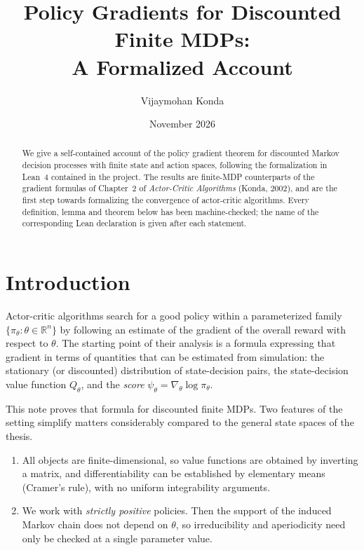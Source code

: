 \documentclass[11pt]{article}
\title{Policy Gradients for Discounted Finite MDPs:\\ A Formalized Account}
\author{Vijaymohan Konda}
\date{November 2026}
\theoremstyle{definition}
\theoremstyle{remark}
\newcommand{\lean}[1]{\texttt{\detokenize{#1}}}
\newcommand{\R}{\mathbb{R}}
\begin{document}
\maketitle

\begin{abstract}
We give a self-contained account of the policy gradient theorem for discounted
Markov decision processes with finite state and action spaces, following the
formalization in Lean~4 contained in the \lean{rl-theory-in-lean} project. The
results are finite-MDP counterparts of the gradient formulas of Chapter~2 of
\emph{Actor-Critic Algorithms} (Konda, 2002), and are the first step towards
formalizing the convergence of actor-critic algorithms. Every definition,
lemma and theorem below has been machine-checked; the name of the corresponding
Lean declaration is given after each statement.
\end{abstract}

\tableofcontents

\section{Introduction}

Actor-critic algorithms search for a good policy within a parameterized family
$\{\pi_\theta : \theta \in \R^n\}$ by following an estimate of the gradient of the
overall reward with respect to $\theta$. The starting point of their analysis is
a formula expressing that gradient in terms of quantities that can be estimated
from simulation: the stationary (or discounted) distribution of state-decision
pairs, the state-decision value function $Q_\theta$, and the \emph{score}
$\psi_\theta = \nabla_\theta \log \pi_\theta$.

This note proves that formula for discounted finite MDPs. Two features of the
setting simplify matters considerably compared to the general state spaces of
the thesis.
\begin{enumerate}
\item All objects are finite-dimensional, so value functions are obtained by
  inverting a matrix, and differentiability can be established by elementary
  means (Cramer's rule), with no uniform integrability arguments.
\item We work with \emph{strictly positive} policies. Then the support of the
  induced Markov chain does not depend on $\theta$, so irreducibility and
  aperiodicity need only be checked at a single parameter value.
\end{enumerate}
\end{document}
